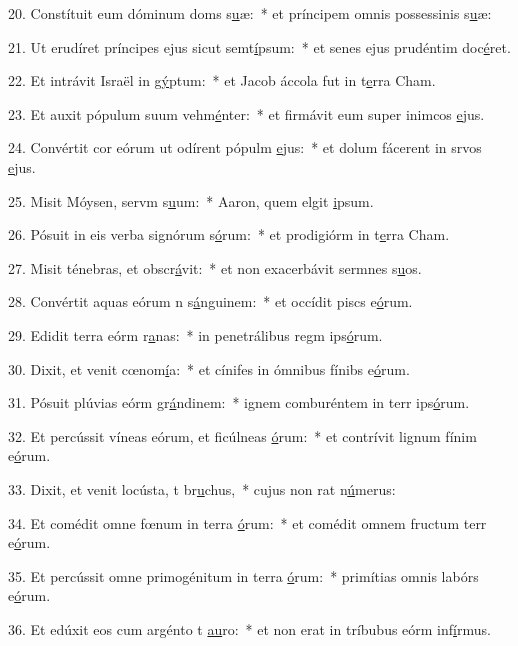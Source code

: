 20. Constítuit eum dóminum doms s\uline{u}æ:~* et príncipem omnis possessinis s\uline{u}æ:\par 
21. Ut erudíret príncipes ejus sicut semt\uline{í}psum:~* et senes ejus prudéntim doc\uline{é}ret.\par 
22. Et intrávit Israël in g\uline{ý}ptum:~* et Jacob áccola fut in t\uline{e}rra Cham.\par 
23. Et auxit pópulum suum vehm\uline{é}nter:~* et firmávit eum super inimcos \uline{e}jus.\par 
24. Convértit cor eórum ut odírent pópulm \uline{e}jus:~* et dolum fácerent in srvos \uline{e}jus.\par 
25. Misit Móysen, servm s\uline{u}um:~* Aaron, quem elgit \uline{i}psum.\par 
26. Pósuit in eis verba signórum s\uline{ó}rum:~* et prodigiórm in t\uline{e}rra Cham.\par 
27. Misit ténebras, et obscr\uline{á}vit:~* et non exacerbávit sermnes s\uline{u}os.\par 
28. Convértit aquas eórum n s\uline{á}nguinem:~* et occídit piscs e\uline{ó}rum.\par 
29. Edidit terra eórm r\uline{a}nas:~* in penetrálibus regm ips\uline{ó}rum.\par 
30. Dixit, et venit cœnom\uline{í}a:~* et cínifes in ómnibus fínibs e\uline{ó}rum.\par 
31. Pósuit plúvias eórm gr\uline{á}ndinem:~* ignem comburéntem in terr ips\uline{ó}rum.\par 
32. Et percússit víneas eórum, et ficúlneas \uline{ó}rum:~* et contrívit lignum fínim e\uline{ó}rum.\par 
33. Dixit, et venit locústa, t br\uline{u}chus,~* cujus non rat n\uline{ú}merus:\par 
34. Et comédit omne fœnum in terra \uline{ó}rum:~* et comédit omnem fructum terr e\uline{ó}rum.\par 
35. Et percússit omne primogénitum in terra \uline{ó}rum:~* primítias omnis labórs e\uline{ó}rum.\par 
36. Et edúxit eos cum argénto t \uline{au}ro:~* et non erat in tríbubus eórm inf\uline{í}rmus.\par 
